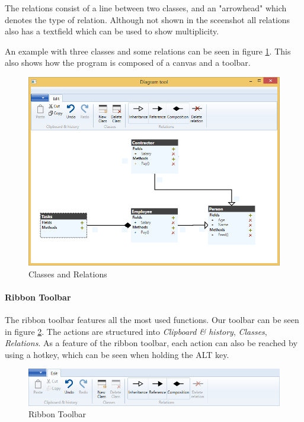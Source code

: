 The relations consist of a line between two classes, and an "arrowhead" which
denotes the type of relation. Although not shown in the sceenshot all relations
also has a textfield which can be used to show multiplicity.

An example with three classes and some relations can be seen in figure
\ref{classes}. This also shows how the program is composed of a canvas and a
toolbar.

\begin{figure}[H]
\centering
\includegraphics[width=\linewidth]{"img/example"}
\caption{Classes and Relations \label{classes}}
\end{figure}


\paragraph{Ribbon Toolbar}
The ribbon toolbar features all the most used functions. Our toolbar can be seen in
figure \ref{toolbar}. The actions are
structured into \textit{Clipboard \& history}, \textit{Classes},
\textit{Relations}. As a feature of the ribbon toolbar, each action can also be
reached by using a hotkey, which can be seen when holding the ALT key.

\begin{figure}[H]
\centering
\includegraphics[width=\linewidth]{"img/edit menu"}
\caption{Ribbon Toolbar \label{toolbar}}
\end{figure}

